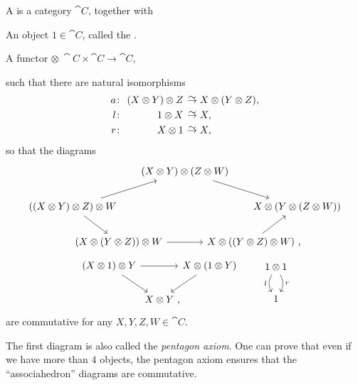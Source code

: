\begin{definition}
    A  is a category $\cat C$, together with
    \begin{itms}
        \item An object $1\in\cat C$, called the .
        \item A functor $\otimes\:\cat C\times\cat C\to\cat C$,
    \end{itms}
    such that there are natural isomorphisms
    \[\setlength{\arraycolsep}{.2em} \begin{array}{rrl}
        a\:&(X\otimes Y)\otimes Z&\simto X\otimes(Y\otimes Z),\\[3pt]
        l\:&1\otimes X&\simto X,\\[3pt]
        r\:&X\otimes 1&\simto X,
    \end{array} \]
    so that the diagrams
    \[ \begin{tikzcd}[column sep=-5em]
        & & \hspace*{2em}(X\otimes Y)\otimes(Z\otimes W)\hspace*{2em}\ar[rrd] \\
        ((X\otimes Y)\otimes Z)\otimes W\ar[rru]\ar[dr] &&&& X\otimes(Y\otimes(Z\otimes W))\\
        & (X\otimes (Y\otimes Z))\otimes W\ar[rr] && X\otimes((Y\otimes Z)\otimes W)\rlap{\ ,}\ar[ur]
    \end{tikzcd} \]
    \[ \begin{tikzcd}[column sep=0]
        (X\otimes 1)\otimes Y\ar[dr]\ar[rr]&&X\otimes(1\otimes Y)\ar[dl]\\
        &X\otimes Y\rlap{\ ,}
    \end{tikzcd}
    \qquad
    \begin{tikzcd}
        1\otimes 1\ar[d,bend left,"r"]\ar[d,bend right,"l"'] \\ 1
    \end{tikzcd}
    \]
    are commutative for any $X,Y,Z,W\in\cat C$.
\end{definition}

The first diagram is also called the \emph{pentagon axiom}.
One can prove that even if we have more than $4$ objects,
the pentagon axiom ensures that the ``associahedron'' diagrams are commutative.

